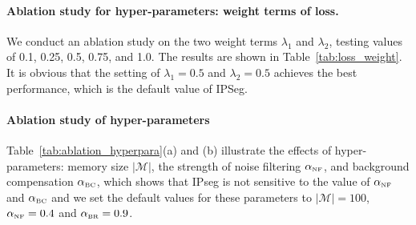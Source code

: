 \begin{table}[h]
    \centering
    \caption{Comparison with other methods in data-free version using Swin-B backbone.}
    \label{tab:impact_mem}
    \vspace{-10pt}
\end{table}



\paragraph{Ablation study for hyper-parameters: weight terms of loss.} We conduct an ablation study on the two weight terms \(\lambda_1\) and \(\lambda_2\), testing values of 0.1, 0.25, 0.5, 0.75, and 1.0. The results are shown in Table~\ref{tab:loss_weight}. It is obvious that the setting of \(\lambda_1=0.5\) and \(\lambda_2=0.5\) achieves the best performance, which is the default value of IPSeg.

\paragraph{Ablation study of hyper-parameters} Table~\ref{tab:ablation_hyperpara}(a) and (b) illustrate the effects of hyper-parameters: memory size \(\left|\mathcal{M}\right|\), the strength of noise filtering \(\alpha_{\text{\tiny NF}}\), and background compensation \(\alpha_{\text{\tiny BC}}\), which shows that IPseg is not sensitive to the value of \(\alpha_{\text{\tiny NF}}\) and \(\alpha_{\text{\tiny BC}}\)
and we set the default values for these parameters to  \(\left|\mathcal{M}\right| = 100\), \(\alpha_{\text{\tiny NF}}=0.4\) and \(\alpha_{\text{\tiny BR}}=0.9\).

